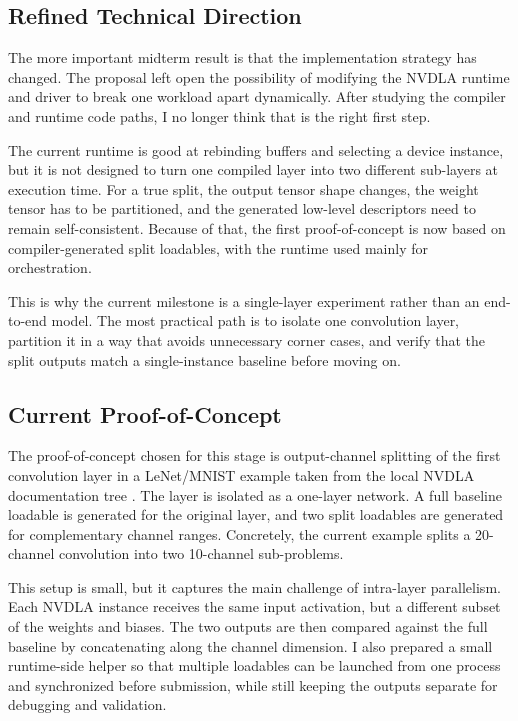 \documentclass[10pt,sigconf,nonacm]{acmart}
\begin{document}
\subsection{Refined Technical Direction}
The more important midterm result is that the implementation strategy has changed. The proposal left open the possibility of modifying the NVDLA runtime and driver to break one workload apart dynamically. After studying the compiler and runtime code paths, I no longer think that is the right first step.

The current runtime is good at rebinding buffers and selecting a device instance, but it is not designed to turn one compiled layer into two different sub-layers at execution time. For a true split, the output tensor shape changes, the weight tensor has to be partitioned, and the generated low-level descriptors need to remain self-consistent. Because of that, the first proof-of-concept is now based on compiler-generated split loadables, with the runtime used mainly for orchestration.

This is why the current milestone is a single-layer experiment rather than an end-to-end model. The most practical path is to isolate one convolution layer, partition it in a way that avoids unnecessary corner cases, and verify that the split outputs match a single-instance baseline before moving on.

\subsection{Current Proof-of-Concept}
The proof-of-concept chosen for this stage is output-channel splitting of the first convolution layer in a LeNet/MNIST example taken from the local NVDLA documentation tree \cite{nvdla_sw_manual}. The layer is isolated as a one-layer network. A full baseline loadable is generated for the original layer, and two split loadables are generated for complementary channel ranges. Concretely, the current example splits a 20-channel convolution into two 10-channel sub-problems.

This setup is small, but it captures the main challenge of intra-layer parallelism. Each NVDLA instance receives the same input activation, but a different subset of the weights and biases. The two outputs are then compared against the full baseline by concatenating along the channel dimension. I also prepared a small runtime-side helper so that multiple loadables can be launched from one process and synchronized before submission, while still keeping the outputs separate for debugging and validation.
\end{document}
